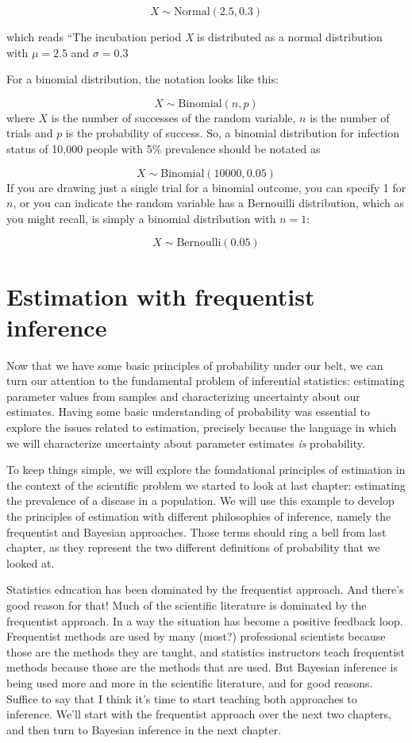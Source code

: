 \documentclass[
]{book}
\begin{document}
\[
X \sim \text{Normal}(2.5, 0.3)
\]

which reads ``The incubation period \emph{X} is distributed as a normal distribution with \(\mu = 2.5\) and \(\sigma = 0.3\)

For a binomial distribution, the notation looks like this:

\[
X\sim \text{Binomial}(n, p)
\]
where \(X\) is the number of successes of the random variable, \(n\) is the number of trials and \(p\) is the probability of success. So, a binomial distribution for infection status of 10,000 people with 5\% prevalence should be notated as

\[
X\sim \text{Binomial}(10000, 0.05)
\]
If you are drawing just a single trial for a binomial outcome, you can specify 1 for \(n\), or you can indicate the random variable has a Bernouilli distribution, which as you might recall, is simply a binomial distribution with \(n = 1\):

\[
X\sim \text{Bernoulli}(0.05)
\]

\chapter{Estimation with frequentist inference}\label{estimation-with-frequentist-inference}

Now that we have some basic principles of probability under our belt, we can turn our attention to the fundamental problem of inferential statistics: estimating parameter values from samples and characterizing uncertainty about our estimates. Having some basic understanding of probability was essential to explore the issues related to estimation, precisely because the language in which we will characterize uncertainty about parameter estimates \emph{is} probability.

To keep things simple, we will explore the foundational principles of estimation in the context of the scientific problem we started to look at last chapter: estimating the prevalence of a disease in a population. We will use this example to develop the principles of estimation with different philosophies of inference, namely the frequentist and Bayesian approaches. Those terms should ring a bell from last chapter, as they represent the two different definitions of probability that we looked at.

Statistics education has been dominated by the frequentist approach. And there's good reason for that! Much of the scientific literature is dominated by the frequentist approach. In a way the situation has become a positive feedback loop. Frequentist methods are used by many (most?) professional scientists because those are the methods they are taught, and statistics instructors teach frequentist methods because those are the methods that are used. But Bayesian inference is being used more and more in the scientific literature, and for good reasons. Suffice to say that I think it's time to start teaching both approaches to inference. We'll start with the frequentist approach over the next two chapters, and then turn to Bayesian inference in the next chapter.
\end{document}
